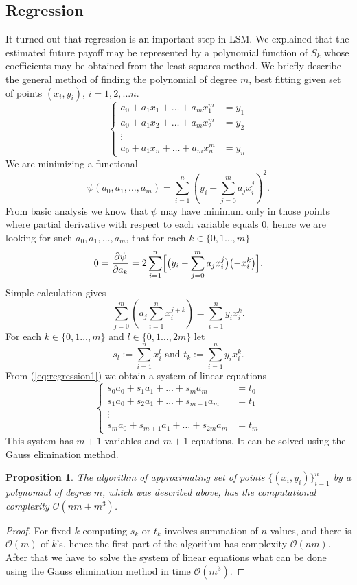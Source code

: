 \documentclass[a4paper,11pt, twoside]{book}
\newtheorem{prop}[thm]{Proposition}
\theoremstyle{definition}
\theoremstyle{remark}
\begin{document}
\subsection{Regression}
It turned out that regression is an important step in LSM. We explained that the estimated future payoff may be represented by a polynomial function of $S_k$ whose coefficients may be obtained from the least squares method. We briefly describe the general method of finding the polynomial of degree $m$, best fitting given set of points $(x_i, y_i)$, $i=1,2,...n$.
\[ \begin{cases}
    a_0 + a_1 x_1 + \ldots + a_m x_1^m &= y_1 \\
    a_0 + a_1 x_2 + \ldots + a_m x_2^m &= y_2 \\
    \vdots & \\
    a_0 + a_1 x_n + \ldots + a_m x_n^m &= y_n
   \end{cases}
\]
We are minimizing a functional
\[ \psi(a_0,a_1,\ldots,a_m) = \sum\limits_{i=1}^n \left( y_i - \sum\limits_{j=0}^m a_jx_i^j \right)^2. \]
From basic analysis we know that $\psi$ may have minimum only in those points where partial derivative with respect to each variable equals 0, hence we are looking for such $a_0,a_1,\ldots,a_m$, that for each $k \in \{0,1\ldots,m\}$
\[ 0 = \frac{\partial \psi}{\partial a_k} = 2  \sum\limits_{i=1}^n \Bigl[ \bigl( y_i - \sum\limits_{j=0}^m a_jx_i^j \bigr) \bigl( -x_i^k \bigr) \Bigl]. \]
Simple calculation gives
\begin{equation}
 \label{eq:regression1}
 \sum\limits_{j=0}^m \left( a_j \sum\limits_{i=1}^n  x_i^{j+k} \right) = \sum\limits_{i=1}^n y_i x_i^k. 
\end{equation}
For each $k \in \{0,1\ldots,m\}$ and $l \in \{0,1\ldots,2m\}$ let
\[ s_{l} := \sum\limits_{i=1}^n  x_i^l \text{\ \ \ and \ \ } t_k := \sum\limits_{i=1}^n y_i x_i^k .\]
From (\ref{eq:regression1}) we obtain a system of linear equations
\begin{equation}
 \label{eq:regression2}
 \begin{cases}
  s_0 a_0 + s_1 a_1 + \ldots + s_m a_m &= t_0 \\
  s_1 a_0 + s_2 a_1 + \ldots + s_{m+1} a_m &= t_1 \\
    \vdots & \\
  s_m a_0 + s_{m+1} a_1 + \ldots + s_{2m} a_m &= t_m
  \end{cases}
\end{equation}
This system has $m+1$ variables and $m+1$ equations. It can be solved using the Gauss elimination method.
\begin{prop}
 The algorithm of approximating set of points $\{ (x_i,y_i) \}_{i=1}^n$ by a polynomial of degree $m$, which was described above, has the computational complexity \mbox{$\mathcal{O}(nm + m^3)$}.
\end{prop}
\begin{proof}
 For fixed $k$ computing $s_k$ or $t_k$ involves summation of $n$ values, and there is $\mathcal{O}(m)$ of $k$'s, hence the first part of the algorithm  has complexity $\mathcal{O}(nm)$. After that we have to solve the system of linear equations what can be done using the Gauss elimination method in time $\mathcal{O}(m^3)$.
\end{proof}
\end{document}
